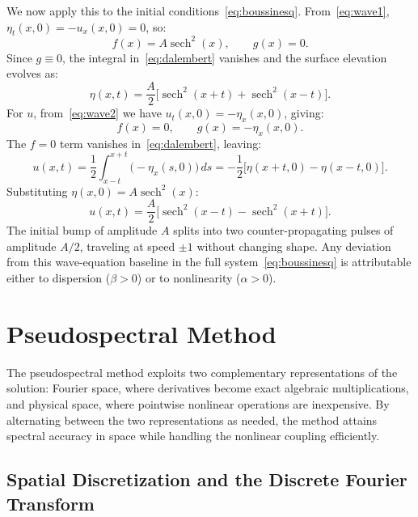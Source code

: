 We now apply this to the initial conditions~\eqref{eq:boussinesq}. From~\eqref{eq:wave1}, $\eta_t(x,0) = -u_x(x,0) = 0$, so:
\begin{equation}
    f(x) = A\operatorname{sech}^2(x), \qquad g(x) = 0.
\end{equation}
Since $g \equiv 0$, the integral in~\eqref{eq:dalembert} vanishes and the surface elevation evolves as:
\begin{equation}\label{eq:dalembert_eta}
    \eta(x, t) = \frac{A}{2}\bigl[\operatorname{sech}^2(x+t) + \operatorname{sech}^2(x-t)\bigr].
\end{equation}
For $u$, from~\eqref{eq:wave2} we have $u_t(x,0) = -\eta_x(x,0)$, giving:
\begin{equation}
    f(x) = 0, \qquad g(x) = -\eta_x(x,0).
\end{equation}
The $f = 0$ term vanishes in~\eqref{eq:dalembert}, leaving:
\begin{equation}
    u(x,t) = \frac{1}{2}\int_{x-t}^{x+t} \bigl(-\eta_x(s,0)\bigr)\,ds
            = -\frac{1}{2}\bigl[\eta(x+t,0) - \eta(x-t,0)\bigr].
\end{equation}
Substituting $\eta(x,0) = A\operatorname{sech}^2(x)$:
\begin{equation}\label{eq:dalembert_u}
    u(x,t) = \frac{A}{2}\bigl[\operatorname{sech}^2(x-t) - \operatorname{sech}^2(x+t)\bigr].
\end{equation}
The initial bump of amplitude $A$ splits into two counter-propagating pulses of amplitude $A/2$, traveling at speed $\pm 1$ without changing shape. Any deviation from this wave-equation baseline in the full system~\eqref{eq:boussinesq} is attributable either to dispersion ($\beta > 0$) or to nonlinearity ($\alpha > 0$).

\section{Pseudospectral Method}
\label{sec:pseudospectral}

The pseudospectral method exploits two complementary representations of the solution: Fourier space, where derivatives become exact algebraic multiplications, and physical space, where pointwise nonlinear operations are inexpensive. By alternating between the two representations as needed, the method attains spectral accuracy in space while handling the nonlinear coupling efficiently.

\subsection{Spatial Discretization and the Discrete Fourier Transform}
\label{subsec:dft}

